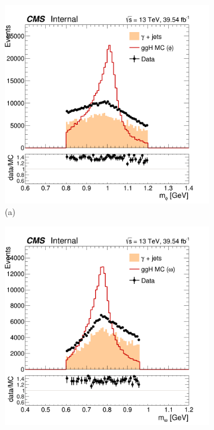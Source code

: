 \begin{figure}[!ht]
    \captionsetup[subfigure]{labelformat=empty}
    \vspace*{-0.2cm}
    \centering
    \setlength{\mylength}{\textwidth}
    \begin{subfigure}[t]{0.50\mylength}
        \centering
        \includegraphics[width=0.45\mylength]{resources/plots/Phi3_mass.png}
        \caption{\footnotesize (a)}
    \end{subfigure}%
    \begin{subfigure}[t]{0.50\mylength}
        \centering
        \includegraphics[width=0.45\mylength]{resources/plots/Omega_mass.png}

\end{subfigure}
\end{figure}
